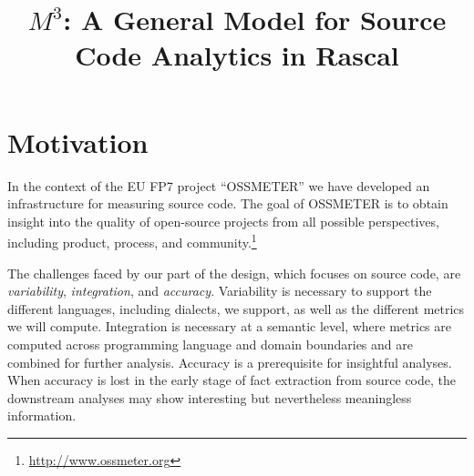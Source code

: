 \documentclass[conference]{IEEEtran}
\begin{document}
\title{{\huge $M^3$: A General Model for Source Code Analytics in Rascal}}

\author{
}

\maketitle

\section{Motivation}

In the context of the EU FP7 project ``OSSMETER'' we have developed an
infrastructure for measuring source code. The goal of OSSMETER is to obtain
insight into the quality of open-source projects from all possible perspectives,
including product, process, and
community.\!\footnote{\url{http://www.ossmeter.org}}

The challenges faced by our part of the design, which focuses on source code,
are \emph{variability}, \emph{integration}, and \emph{accuracy}. Variability is
necessary to support the different languages, including dialects, we support,
as well as the different metrics we will compute. Integration is necessary at
a semantic level, where metrics are computed across programming language and
domain boundaries and are combined for further analysis. Accuracy is a
prerequisite for insightful analyses. When accuracy is lost in the early stage
of fact extraction from source code, the downstream analyses may show
interesting but nevertheless meaningless information.
\end{document}
